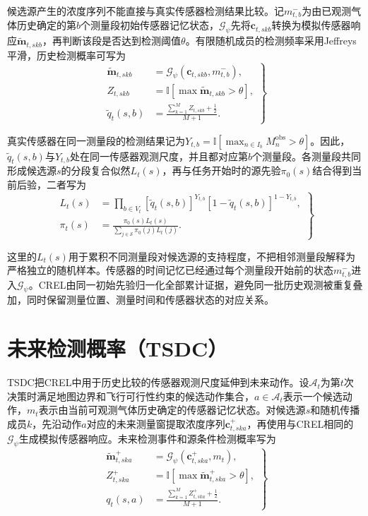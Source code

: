\documentclass{aas}
\newcommand{\I}{\mathbb{I}}
\newcommand{\ccite}[1]{\nobreak\cite{#1}}
\begin{document}
候选源产生的浓度序列不能直接与真实传感器检测结果比较。记$m^-_{t,b}$为由已观测气体历史确定的第$b$个测量段初始传感器记忆状态，$\mathcal G_{\psi}$先将$\mathbf c_{t,skb}$转换为模拟传感器响应$\widetilde{\mathbf m}_{t,skb}$，再判断该段是否达到检测阈值$\theta$。有限随机成员的检测频率采用Jeffreys平滑\ccite{30}，历史检测概率可写为
\begin{equation}
\left.
\begin{aligned}
\widetilde{\mathbf m}_{t,skb}&=\mathcal G_{\psi}(\mathbf c_{t,skb},m^-_{t,b}),\\
Z_{t,skb}&=\I\!\left[\max \widetilde{\mathbf m}_{t,skb}>\theta\right],\\
\widetilde q_t(s,b)&=\frac{\sum_{k=1}^{M}Z_{t,skb}+\tfrac12}{M+1}.
\end{aligned}
\right\}
\label{eq:crel_sensor_probability}
\end{equation}

真实传感器在同一测量段的检测结果记为$Y_{t,b}=\I[\max_{n\in I_b}M_n^{\mathrm{obs}}>\theta]$。因此，$\widetilde q_t(s,b)$与$Y_{t,b}$处在同一传感器观测尺度，并且都对应第$b$个测量段。各测量段共同形成候选源$s$的分段复合似然$L_t(s)$，再与任务开始时的源先验$\pi_0(s)$结合得到当前后验，二者写为
\begin{equation}
\left.
\begin{aligned}
L_t(s)&=\prod_{b\in V_t}\left[\widetilde q_t(s,b)\right]^{Y_{t,b}}
\left[1-\widetilde q_t(s,b)\right]^{1-Y_{t,b}},\\[1mm]
\pi_t(s)&=\frac{\pi_0(s)L_t(s)}{\sum_{j\in\mathcal S}\pi_0(j)L_t(j)}.
\end{aligned}
\right\}
\label{eq:crel_evidence_posterior}
\end{equation}

这里的$L_t(s)$用于累积不同测量段对候选源的支持程度，不把相邻测量段解释为严格独立的随机样本。传感器的时间记忆已经通过每个测量段开始前的状态$m^-_{t,b}$进入$\mathcal G_{\psi}$。CREL由同一初始先验归一化全部累计证据，避免同一批历史观测被重复叠加，同时保留测量位置、测量时间和传感器状态的对应关系。

\section{未来检测概率（TSDC）}

TSDC把CREL中用于历史比较的传感器观测尺度延伸到未来动作。设$\mathcal A_t$为第$t$次决策时满足地图边界和飞行可行性约束的候选动作集合，$a\in\mathcal A_t$表示一个候选动作，$m_t$表示由当前可观测气体历史确定的传感器记忆状态。对候选源$s$和随机传播成员$k$，先沿动作$a$对应的未来测量窗提取浓度序列$\mathbf c^+_{t,ska}$，再使用与CREL相同的$\mathcal G_{\psi}$生成模拟传感器响应。未来检测事件和源条件检测概率写为
\begin{equation}
\left.
\begin{aligned}
\widetilde{\mathbf m}^{+}_{t,ska}&=\mathcal G_{\psi}(\mathbf c^{+}_{t,ska},m_t),\\
Z^{+}_{t,ska}&=\I\!\left[\max \widetilde{\mathbf m}^{+}_{t,ska}>\theta\right],\\
q_t(s,a)&=\frac{\sum_{k=1}^{M}Z^{+}_{t,ska}+\tfrac12}{M+1}.
\end{aligned}
\right\}
\label{eq:tsdc_detection_probability}
\end{equation}
\end{document}
